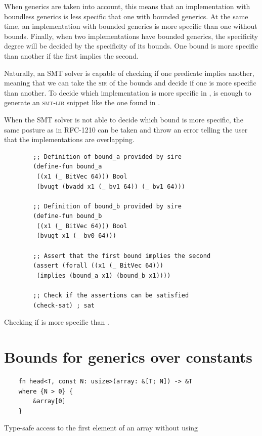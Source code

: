 When generics are taken into account, this means that an implementation with
boundless generics is less specific that one with bounded generics. At the same
time, an implementation with bounded generics is more specific than one without
bounds. Finally, when two implementations have bounded generics, the
specificity degree will be decided by the specificity of its bounds. One bound
is more specific than another if the first implies the second.

Naturally, an SMT solver is capable of checking if one predicate implies
another, meaning that we can take the \textsc{sir} of the bounds and decide if
one is more specific than another. To decide which implementation is more
specific in , is enough to generate an
\textsc{smt-lib} snippet like the one found in .

When the SMT solver is not able to decide which bound is more specific, the
same posture as in RFC-1210 can be taken and throw an error telling the user
that the implementations are overlapping.

\begin{listing}[ht]
	\begin{verbatim}
        ;; Definition of bound_a provided by sire
        (define-fun bound_a
         ((x1 (_ BitVec 64))) Bool 
         (bvugt (bvadd x1 (_ bv1 64)) (_ bv1 64)))

        ;; Definition of bound_b provided by sire
        (define-fun bound_b 
         ((x1 (_ BitVec 64))) Bool 
         (bvugt x1 (_ bv0 64)))

        ;; Assert that the first bound implies the second
        (assert (forall ((x1 (_ BitVec 64))) 
         (implies (bound_a x1) (bound_b x1))))

        ;; Check if the assertions can be satisfied
        (check-sat) ; sat
	\end{verbatim}
    \caption{Checking if  is more specific than .}
  \label{lst:trait_spec_smt}
\end{listing}

\section{Bounds for generics over constants}

\begin{listing}[ht]
	\begin{verbatim}
    fn head<T, const N: usize>(array: &[T; N]) -> &T
    where {N > 0} {
        &array[0]
    }
    \end{verbatim}
    \caption{Type-safe access to the first element of an array without using
    }
  \label{lst:head_const_generics}
\end{listing}
